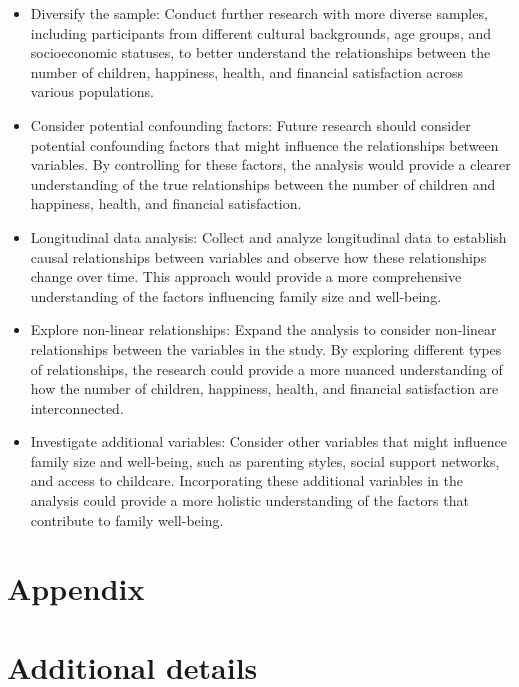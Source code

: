 \documentclass[
  letterpaper,
  DIV=11,
  numbers=noendperiod]{scrartcl}
\providecommand{\tightlist}{%
  \setlength{\itemsep}{0pt}\setlength{\parskip}{0pt}}\usepackage{longtable,booktabs,array}
\begin{document}
\begin{itemize}
\tightlist
\item
  Diversify the sample: Conduct further research with more diverse
  samples, including participants from different cultural backgrounds,
  age groups, and socioeconomic statuses, to better understand the
  relationships between the number of children, happiness, health, and
  financial satisfaction across various populations.
\item
  Consider potential confounding factors: Future research should
  consider potential confounding factors that might influence the
  relationships between variables. By controlling for these factors, the
  analysis would provide a clearer understanding of the true
  relationships between the number of children and happiness, health,
  and financial satisfaction.
\item
  Longitudinal data analysis: Collect and analyze longitudinal data to
  establish causal relationships between variables and observe how these
  relationships change over time. This approach would provide a more
  comprehensive understanding of the factors influencing family size and
  well-being.
\item
  Explore non-linear relationships: Expand the analysis to consider
  non-linear relationships between the variables in the study. By
  exploring different types of relationships, the research could provide
  a more nuanced understanding of how the number of children, happiness,
  health, and financial satisfaction are interconnected.
\item
  Investigate additional variables: Consider other variables that might
  influence family size and well-being, such as parenting styles, social
  support networks, and access to childcare. Incorporating these
  additional variables in the analysis could provide a more holistic
  understanding of the factors that contribute to family well-being.
\end{itemize}

\newpage

\appendix

\hypertarget{appendix}{%
\section*{Appendix}\label{appendix}}

\hypertarget{additional-details}{%
\section{Additional details}\label{additional-details}}
\end{document}
